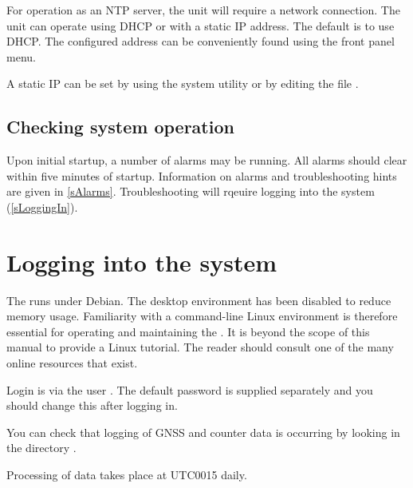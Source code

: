 For operation as an NTP server, the unit will require a network connection.
The unit can operate using DHCP or with
a static IP address. The default is to use DHCP. The configured address can be conveniently found using the 
front panel menu.

A static IP can be set by using the system utility  or by editing the file 
.

\subsection{Checking system operation}

Upon initial startup, a number of alarms may be running. 
All alarms should clear within five minutes of startup.
Information on alarms and troubleshooting hints are given in \ref{sAlarms}. Troubleshooting
will rqeuire logging into the system (\ref{sLoggingIn}).


\section{Logging into the system \label{sLoggingIn}}

The \sysname{} runs under Debian. The desktop environment has been disabled to reduce memory usage.
Familiarity with a command-line Linux environment is therefore essential for operating and maintaining
the \sysname{}. It is beyond the scope of this manual to provide a Linux tutorial. The reader should 
consult one of the many online resources that exist.

Login is via the user . The default password is supplied separately and you should change
this after logging in.

You can check that logging of GNSS and counter data is occurring by looking in the directory 
.

Processing of data takes place at UTC0015 daily. 


	


